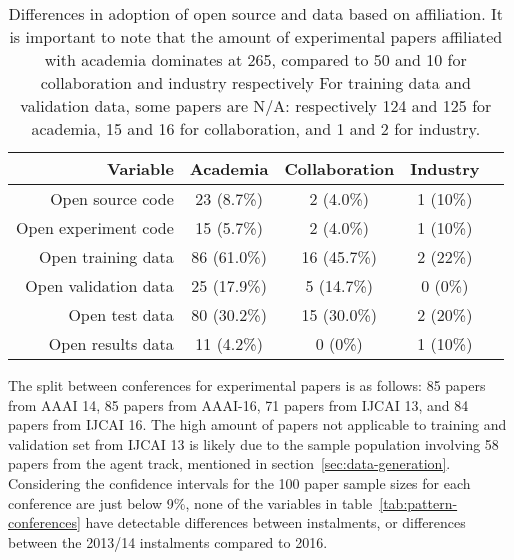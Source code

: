 \begin{table}[!h]
\begin{center}
    \begin{tabular}{ r|cccc }
    \textbf{Variable} & \textbf{Academia} & \textbf{Collaboration} & \textbf{Industry} \\ \hline
    Open source code & 23 (8.7\%) & 2 (4.0\%) & 1 (10\%) \\
    Open experiment code & 15 (5.7\%) & 2 (4.0\%) & 1 (10\%) \\
    Open training data & 86 (61.0\%) & 16 (45.7\%) & 2 (22\%) \\
    Open validation data & 25 (17.9\%) & 5 (14.7\%) & 0 (0\%) \\
    Open test data & 80 (30.2\%) & 15 (30.0\%) & 2 (20\%) \\
    Open results data & 11 (4.2\%) & 0 (0\%) & 1 (10\%) \\
    \end{tabular}
\end{center}
\caption[Open source and data compared to affiliation.]{Differences in adoption of open source and data based on affiliation. It is important to note that the amount of experimental papers affiliated with academia dominates at 265, compared to 50 and 10 for collaboration and industry respectively For training data and validation data, some papers are N/A: respectively 124 and 125 for academia, 15 and 16 for collaboration, and 1 and 2 for industry.}
\label{tab:affiliation}
\end{table}

The split between conferences for experimental papers is as follows: 85 papers from AAAI 14, 85 papers from AAAI-16, 71 papers from IJCAI 13, and 84 papers from IJCAI 16. The high amount of papers not applicable to training and validation set from IJCAI 13 is likely due to the sample population involving 58 papers from the agent track, mentioned in section~\ref{sec:data-generation}. Considering the confidence intervals for the 100 paper sample sizes for each conference are just below 9\%, none of the variables in table~\ref{tab:pattern-conferences} have detectable differences between instalments, or differences between the 2013/14 instalments compared to 2016.

